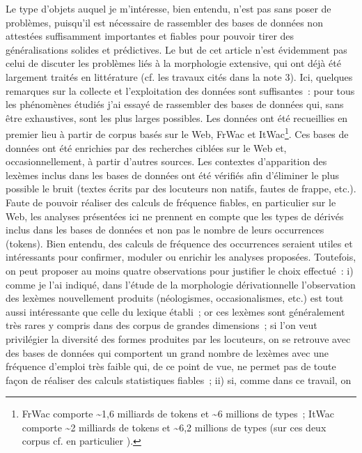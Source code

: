 \documentclass[output=paper]{langsci/langscibook}
\begin{document}
Le type d'objets auquel je m'intéresse, bien entendu, n'est pas sans
poser de problèmes, puisqu'il est nécessaire de rassembler des bases de
données non attestées suffisamment importantes et fiables pour pouvoir
tirer des généralisations solides et prédictives. Le but de cet article
n'est évidemment pas celui de discuter les problèmes liés à la
morphologie extensive, qui ont déjà été largement traités en littérature
(cf. les travaux cités dans la note 3). Ici, quelques remarques sur la
collecte et l'exploitation des données sont suffisantes~: pour tous les
phénomènes étudiés j'ai essayé de rassembler des bases de données qui,
sans être exhaustives, sont les plus larges possibles. Les données ont
été recueillies en premier lieu à partir de corpus basés sur le Web,
FrWac et ItWac\footnote{FrWac comporte \textasciitilde{}1,6 milliards de
  tokens et \textasciitilde{}6 millions de types~; ItWac comporte
  \textasciitilde{}2 milliards de tokens et \textasciitilde{}6,2
  millions de types (sur ces deux corpus cf. en particulier %
\citealt{Baroni2009}).}. Ces bases de
données ont été enrichies par des recherches ciblées sur le Web et,
occasionnellement, à partir d'autres sources. Les contextes d'apparition
des lexèmes inclus dans les bases de données ont été vérifiés afin
d'éliminer le plus possible le bruit (textes écrits par des locuteurs
non natifs, fautes de frappe, etc.). Faute de pouvoir réaliser des
calculs de fréquence fiables, en particulier sur le Web, les analyses
présentées ici ne prennent en compte que les types de dérivés inclus
dans les bases de données et non pas le nombre de leurs occurrences
(tokens). Bien entendu, des calculs de fréquence des occurrences
seraient utiles et intéressants pour confirmer, moduler ou enrichir les
analyses proposées. Toutefois, on peut proposer au moins quatre
observations pour justifier le choix effectué~: i) comme je l'ai
indiqué, dans l'étude de la morphologie dérivationnelle l'observation
des lexèmes nouvellement produits (néologismes, occasionalismes, etc.)
est tout aussi intéressante que celle du lexique établi~; or ces lexèmes
sont généralement très rares y compris dans des corpus de grandes
dimensions~; si l'on veut privilégier la diversité des formes produites
par les locuteurs, on se retrouve avec des bases de données qui
comportent un grand nombre de lexèmes avec une fréquence d'emploi très
faible qui, de ce point de vue, ne permet pas de toute façon de réaliser
des calculs statistiques fiables~; ii) si, comme dans ce travail, on
\end{document}
